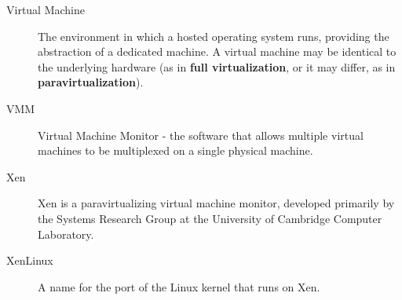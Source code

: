 \documentclass[11pt,twoside,final,openright]{report}
\begin{document}
\begin{description}
\item[Virtual Machine] The environment in which a hosted operating
  system runs, providing the abstraction of a dedicated machine.  A
  virtual machine may be identical to the underlying hardware (as in
  {\bf full virtualization}, or it may differ, as in {\bf
  paravirtualization}).

\item[VMM] Virtual Machine Monitor - the software that allows multiple
  virtual machines to be multiplexed on a single physical machine.

\item[Xen] Xen is a paravirtualizing virtual machine monitor,
  developed primarily by the Systems Research Group at the University
  of Cambridge Computer Laboratory.

\item[XenLinux] A name for the port of the Linux kernel that
  runs on Xen.

\end{description}
\end{document}
